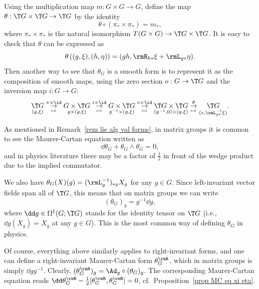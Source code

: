 \begin{rem}
    Using the multiplication map $m:G\times G\to G$, define the map $\theta:\T G\times \T G\to \T G$ by the identity
    \[\theta\circ (\pi_\ast\times \pi_\ast)=m_\ast,\]
    where $\pi_\ast\times \pi_\ast$ is the natural isomorphism $T(G\times G)\to \T G\times \T G$. It is easy to check that $\theta$ can be expressed as
    \[\theta\left((g,\xi),(h,\eta)\right)=(gh,\rmR_{h\ast}\xi+\rmL_{g\ast}\eta).\label{eq m_ast}\]
    Then another way to see that $\theta_G$ is a smooth form is to represent it as the composition of smooth maps, using the zero section $o:G\to \T G$ and the inversion map $i:G\to G$:
    \[\underset{(g,\xi)}{\T G}
    \underset{\mapsto}{\overset{\pi\times\id}{\to}}
    \underset{g\times (g,\xi)}{G\times \T G}
    \underset{\mapsto}{\overset{i\times\id}{\to}}
    \underset{g^{-1}\times (g,\xi)}{G\times \T G}
    \underset{\mapsto}{\overset{o\times\id}{\to}}
    \underset{(g^{-1},0)\times (g,\xi)}{\T G\times \T G}
    \underset{\mapsto}{\overset{\theta}{\to}}
    \underset{(e,\rmL_{g\ast}^{-1}\xi)}{\T G}.\label{eq MC form as composition}
    \]
\end{rem}


\begin{rem}
    As mentioned in Remark~\ref{rem lie alg val forms}, in matrix groups it is common to see the Maurer-Cartan equation written as 
    \[\dd\theta_G +\theta_G\wedge\theta_G=0,\]
    and in physics literature there may be a factor of $\frac12$ in front of the wedge product due to the implied commutator.

    We also have $\theta_G(X)(g)=(\rmL_{g}^{-1})_{\ast g}X_g$ for any $g\in G$. Since left-invariant vector fields span all of $\T G$, this means that on matrix groups we can write 
    \[(\theta_G)_g=g^{-1}\dd g,\]
    where $\dd g\in \Omega^1(G;\T G)$ stands for the identity tensor on $\T G$ (i.e., $\dd g(X_g)=X_g$ at any $g\in G$). This is the most common way of defining $\theta_G$ in physics.
\end{rem}

\begin{rem}\label{rem right MC eq}
    Of course, everything above similarly applies to right-invariant forms, and one can define a right-invariant Maurer-Cartan form $\theta_G^\rmR$, which in matrix groups is simply $\dd g g^{-1}$. Clearly, $(\theta_G^\rmR)_g=\Ad_g\circ(\theta_G)_g$. The corresponding Maurer-Cartan equation reads $\dd\theta_G^\rmR-\frac12[\theta_G^\rmR,\theta_G^\rmR]=0$, cf.\ Proposition~\ref{prop MC eq xi eta}.
\end{rem}

